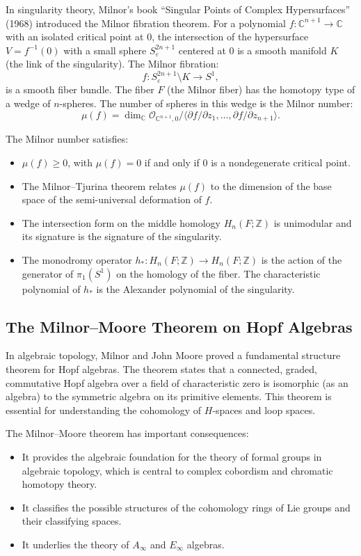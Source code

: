 In singularity theory, Milnor's book ``Singular Points of Complex Hypersurfaces'' (1968) introduced the Milnor fibration theorem. For a polynomial $f: \mathbb{C}^{n+1} \to \mathbb{C}$ with an isolated critical point at $0$, the intersection of the hypersurface $V = f^{-1}(0)$ with a small sphere $S_\varepsilon^{2n+1}$ centered at $0$ is a smooth manifold $K$ (the link of the singularity). The Milnor fibration:
\[
f: S_\varepsilon^{2n+1} \setminus K \to S^1,
\]
is a smooth fiber bundle. The fiber $F$ (the Milnor fiber) has the homotopy type of a wedge of $n$-spheres. The number of spheres in this wedge is the Milnor number:
\[
\mu(f) = \dim_{\mathbb{C}} \mathcal{O}_{\mathbb{C}^{n+1},0} / \langle \partial f/\partial z_1, \ldots, \partial f/\partial z_{n+1} \rangle.
\]

The Milnor number satisfies:
\begin{itemize}
\item $\mu(f) \geq 0$, with $\mu(f) = 0$ if and only if $0$ is a nondegenerate critical point.
\item The Milnor--Tjurina theorem relates $\mu(f)$ to the dimension of the base space of the semi-universal deformation of $f$.
\item The intersection form on the middle homology $H_n(F; \mathbb{Z})$ is unimodular and its signature is the signature of the singularity.
\item The monodromy operator $h_*: H_n(F; \mathbb{Z}) \to H_n(F; \mathbb{Z})$ is the action of the generator of $\pi_1(S^1)$ on the homology of the fiber. The characteristic polynomial of $h_*$ is the Alexander polynomial of the singularity.
\end{itemize}

\subsection{The Milnor--Moore Theorem on Hopf Algebras}

In algebraic topology, Milnor and John Moore proved a fundamental structure theorem for Hopf algebras. The theorem states that a connected, graded, commutative Hopf algebra over a field of characteristic zero is isomorphic (as an algebra) to the symmetric algebra on its primitive elements. This theorem is essential for understanding the cohomology of $H$-spaces and loop spaces.

The Milnor--Moore theorem has important consequences:
\begin{itemize}
\item It provides the algebraic foundation for the theory of formal groups in algebraic topology, which is central to complex cobordism and chromatic homotopy theory.
\item It classifies the possible structures of the cohomology rings of Lie groups and their classifying spaces.
\item It underlies the theory of $A_\infty$ and $E_\infty$ algebras.
\end{itemize}

